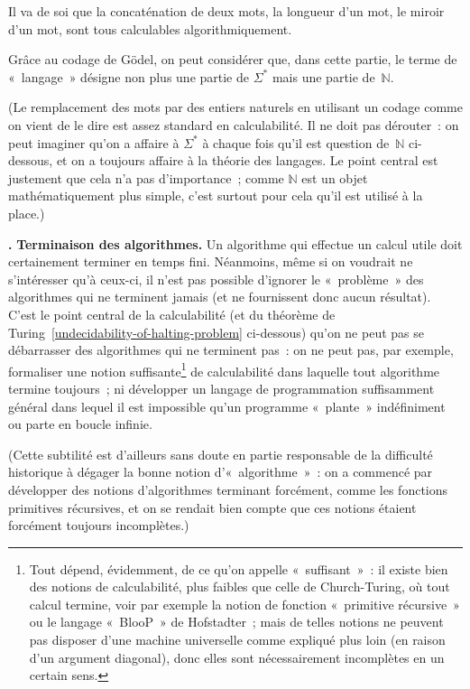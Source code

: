 \documentclass[12pt,a4paper]{article}
\theoremstyle{definition}
\newcommand\thingy{%
\refstepcounter{comcnt}\medskip\noindent\textbf{\thecomcnt.} }
\begin{document}
Il va de soi que la concaténation de deux mots, la longueur d'un mot,
le miroir d'un mot, sont tous calculables algorithmiquement.

\smallskip

Grâce au codage de Gödel, on peut considérer que, dans cette partie,
le terme de « langage » désigne non plus une partie de
$\Sigma^*$ mais une partie de $\mathbb{N}$.

{\footnotesize (Le remplacement des mots par des entiers naturels en
  utilisant un codage comme on vient de le dire est assez standard en
  calculabilité.  Il ne doit pas dérouter : on peut imaginer qu'on a
  affaire à $\Sigma^*$ à chaque fois qu'il est question
  de $\mathbb{N}$ ci-dessous, et on a toujours affaire à la théorie
  des langages.  Le point central est justement que cela n'a pas
  d'importance ; comme $\mathbb{N}$ est un objet mathématiquement plus
  simple, c'est surtout pour cela qu'il est utilisé à la place.)\par}

\bigbreak

\thingy\textbf{Terminaison des algorithmes.} Un algorithme qui
effectue un calcul utile doit certainement terminer en temps fini.
Néanmoins, même si on voudrait ne s'intéresser qu'à ceux-ci, il n'est
pas possible d'ignorer le « problème » des algorithmes qui ne
terminent jamais (et ne fournissent donc aucun résultat).  C'est le
point central de la calculabilité (et du théorème de
Turing \ref{undecidability-of-halting-problem} ci-dessous) qu'on ne
peut pas se débarrasser des algorithmes qui ne terminent pas : on ne
peut pas, par exemple, formaliser une notion suffisante\footnote{Tout
  dépend, évidemment, de ce qu'on appelle « suffisant » : il existe
  bien des notions de calculabilité, plus faibles que celle de
  Church-Turing, où tout calcul termine, voir par exemple la notion de
  fonction « primitive récursive » ou le langage « BlooP » de
  Hofstadter ; mais de telles notions ne peuvent pas disposer d'une
  machine universelle comme expliqué plus loin (en raison d'un
  argument diagonal), donc elles sont nécessairement incomplètes en un
  certain sens.} de calculabilité dans laquelle tout algorithme
termine toujours ; ni développer un langage de programmation
suffisamment général dans lequel il est impossible qu'un programme
« plante » indéfiniment ou parte en boucle infinie.

{\footnotesize (Cette subtilité est d'ailleurs sans doute en partie
  responsable de la difficulté historique à dégager la bonne notion
  d'« algorithme » : on a commencé par développer des notions
  d'algorithmes terminant forcément, comme les fonctions primitives
  récursives, et on se rendait bien compte que ces notions étaient
  forcément toujours incomplètes.)\par}
\end{document}
